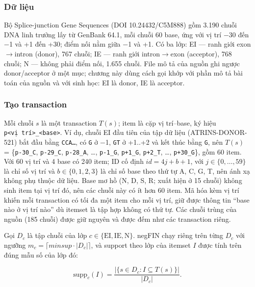 \subsubsection{Dữ liệu}

Bộ Splice-junction Gene Sequences \cite{splice} (DOI 10.24432/C5M888) gồm 3.190 chuỗi DNA linh trưởng lấy từ GenBank 64.1, mỗi chuỗi 60 base, ứng với vị trí −30 đến −1 và +1 đến +30; điểm nối nằm giữa −1 và +1. Có ba lớp: EI --- ranh giới exon$\rightarrow$intron (donor), 767 chuỗi; IE --- ranh giới intron$\rightarrow$exon (acceptor), 768 chuỗi; N --- không phải điểm nối, 1.655 chuỗi. File mô tả của nguồn ghi ngược donor/acceptor ở một mục; chương này dùng cách gọi khớp với phần mô tả bài toán của nguồn và với sinh học: EI là donor, IE là acceptor.

\subsubsection{Tạo transaction}

Mỗi chuỗi \(s\) là một transaction \(T(s)\); item là cặp vị trí--base, ký hiệu \texttt{p\textless{}vị\ trí\textgreater{}\_\textless{}base\textgreater{}}. Ví dụ, chuỗi EI đầu tiên của tập dữ liệu (ATRINS-DONOR-521) bắt đầu bằng \texttt{CCA…}, có \texttt{G} ở −1, \texttt{GT} ở +1..+2 và kết thúc bằng \texttt{G}, nên \(T(s)\) = \{\texttt{p-30\_C}, \texttt{p-29\_C}, \texttt{p-28\_A}, \ldots, \texttt{p-1\_G}, \texttt{p+1\_G}, \texttt{p+2\_T}, \ldots, \texttt{p+30\_G}\}, gồm 60 item. Với 60 vị trí và 4 base có 240 item; ID cố định \(\mathit{id} = 4j + b + 1\), với \(j \in \{0,\ldots,59\}\) là chỉ số vị trí và \(b \in \{0,1,2,3\}\) là chỉ số base theo thứ tự A, C, G, T, nên ánh xạ không phụ thuộc dữ liệu. Base mơ hồ (N, D, S, R; xuất hiện ở 15 chuỗi) không sinh item tại vị trí đó, nên các chuỗi này có ít hơn 60 item. Mã hóa kèm vị trí khiến mỗi transaction có tối đa một item cho mỗi vị trí, giữ được thông tin ``base nào ở vị trí nào'' dù itemset là tập hợp không có thứ tự. Các chuỗi trùng của nguồn (185 chuỗi) được giữ nguyên và được đếm như các transaction riêng.

Gọi \(D_c\) là tập chuỗi của lớp \(c \in \{\mathrm{EI}, \mathrm{IE}, \mathrm{N}\}\). negFIN chạy riêng trên từng \(D_c\) với ngưỡng \(m_c = \lceil \mathit{minsup}\cdot|D_c|\rceil\), và support theo lớp của itemset \(I\) được tính trên đúng mẫu số của lớp đó:

\begin{equation}
\mathrm{supp}_c(I) = \frac{|\{s \in D_c : I \subseteq T(s)\}|}{|D_c|}.
\end{equation}

